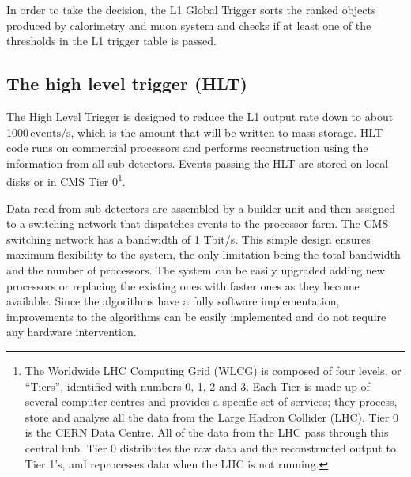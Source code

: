 In order to take the decision, the L1 Global Trigger sorts the ranked objects produced by calorimetry and muon system and checks if at least one of the thresholds in the L1 trigger table is passed.

\subsection{The high level trigger (HLT)}

The High Level Trigger is designed to reduce the L1 output rate down to about 1000\,$\mathrm{events/s}$, which is the amount that will be written to mass storage. HLT code runs on commercial processors and performs reconstruction using the information from all sub-detectors. Events passing
the HLT are stored on local disks or in CMS Tier 0\footnote{The Worldwide LHC Computing Grid (WLCG) is composed of four levels, or ``Tiers'', identified with numbers 0, 1, 2 and 3. Each Tier is made up of several computer centres and provides a specific set of services; they process, store and analyse all the data from the Large Hadron Collider (LHC). Tier 0 is the CERN Data Centre. All of the data from the LHC pass through this central hub. Tier 0 distributes the raw data and the reconstructed output to Tier 1's, and reprocesses data when the LHC is not running.}. 

Data read from sub-detectors are assembled by a builder unit and then assigned to a switching network that dispatches events to the processor farm. The CMS switching network has a bandwidth of 1 Tbit/s. This simple design ensures maximum flexibility to the system, the only limitation being the total bandwidth and the number of processors. The system can be easily upgraded adding new processors or replacing the existing ones with faster ones as they become available. Since the algorithms have a fully software implementation, improvements to the algorithms can be easily implemented and do not require any hardware intervention.

